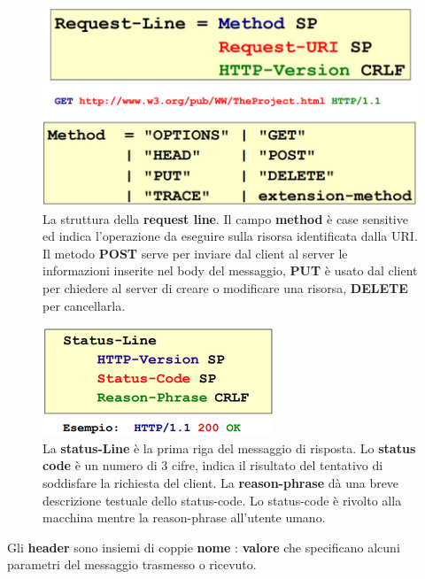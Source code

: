 \documentclass[11pt,a4paper]{article}
\theoremstyle{definition}
\begin{document}
\newpage
\begin{figure}[!h]
	\includegraphics[scale=0.3]{Immagini/Req_line.png}
	\centering
	\caption{La struttura della \textbf{request line}. Il campo \textbf{method} è case sensitive ed indica l'operazione da eseguire sulla risorsa identificata dalla URI. Il metodo \textbf{POST} serve per inviare dal client al server le
		informazioni inserite nel body del messaggio, \textbf{PUT} è usato dal client per chiedere al server di creare o modificare una risorsa, \textbf{DELETE} per cancellarla.}
\end{figure}
\begin{figure}[!h]
	\includegraphics[scale=0.4]{Immagini/Stat_line.png}
	\centering
	\caption{La \textbf{status-Line} è la prima riga del messaggio di risposta. Lo \textbf{status code} è un numero di 3 cifre, indica il risultato del tentativo di soddisfare la richiesta del client. La \textbf{reason-phrase} dà una breve descrizione testuale dello status-code. Lo status-code è rivolto alla macchina mentre la reason-phrase all'utente umano.}
\end{figure}
Gli \textbf{header} sono insiemi di coppie \textbf{nome} : \textbf{valore} che specificano
alcuni parametri del messaggio trasmesso o ricevuto.
\end{document}
